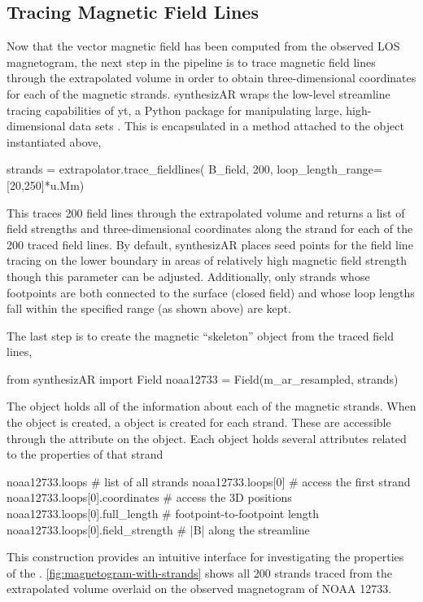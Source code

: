 \subsection{Tracing Magnetic Field Lines}\label{sec:trace-fieldlines}

Now that the vector magnetic field has been computed from the observed LOS magnetogram, the next step in the pipeline is to trace magnetic field lines through the extrapolated volume in order to obtain three-dimensional coordinates for each of the magnetic strands. synthesizAR wraps the low-level streamline tracing capabilities of yt, a Python package for manipulating large, high-dimensional data sets \citep{turk_yt_2011}. This is encapsulated in a method attached to the  object instantiated above,
\begin{pyblock}[chapter4][baselinestretch=1,xleftmargin=3em]
strands = extrapolator.trace_fieldlines(
    B_field, 200, loop_length_range=[20,250]*u.Mm)
\end{pyblock}
This traces 200 field lines through the extrapolated volume and returns a list of field strengths and three-dimensional coordinates along the strand for each of the 200 traced field lines. By default, synthesizAR places seed points for the field line tracing on the lower boundary in areas of relatively high magnetic field strength though this parameter can be adjusted. Additionally, only strands whose footpoints are both connected to the surface (closed field) and whose loop lengths fall within the specified range (as shown above) are kept.

The last step is to create the magnetic ``skeleton'' object from the traced field lines,
\begin{pyblock}[chapter4][baselinestretch=1,xleftmargin=3em]
from synthesizAR import Field
noaa12733 = Field(m_ar_resampled, strands)
\end{pyblock}
The  object holds all of the information about each of the magnetic strands. When the  object is created, a  object is created for each strand. These are accessible through the  attribute on the  object. Each  object holds several attributes related to the properties of that strand
\begin{pyblock}[chapter4][baselinestretch=1,xleftmargin=3em]
noaa12733.loops  # list of all strands
noaa12733.loops[0]  # access the first strand
noaa12733.loops[0].coordinates  # access the 3D positions
noaa12733.loops[0].full_length  # footpoint-to-footpoint length
noaa12733.loops[0].field_strength  # |B| along the streamline
\end{pyblock}
This construction provides an intuitive interface for investigating the properties of the \AR{}. \autoref{fig:magnetogram-with-strands} shows all 200 strands traced from the extrapolated volume overlaid on the observed magnetogram of NOAA 12733. 

